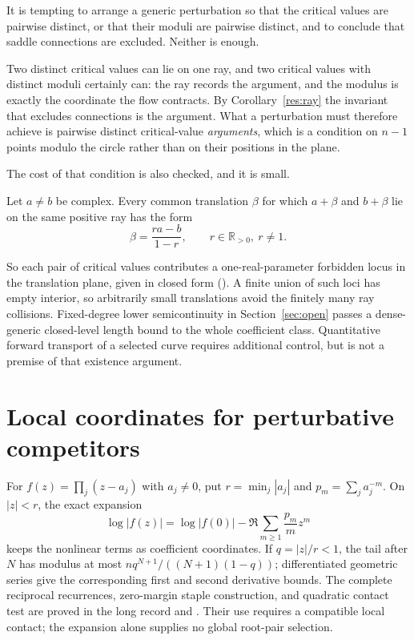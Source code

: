\documentclass[11pt]{article}
\newcommand{\pdecl}[1]{\emph{\leanlabel{#1}}}
\begin{document}
It is tempting to arrange a generic perturbation so that the critical values
are pairwise distinct, or that their moduli are pairwise distinct, and to
conclude that saddle connections are excluded.  Neither is enough.

Two distinct critical values can lie on one ray, and two critical values with
distinct moduli certainly can: the ray records the argument, and the modulus is
exactly the coordinate the flow contracts.  By Corollary~\ref{res:ray} the
invariant that excludes connections is the argument.  What a perturbation must
therefore achieve is pairwise distinct critical-value \emph{arguments}, which is
a condition on $n-1$ points modulo the circle rather than on their positions in
the plane.

The cost of that condition is also checked, and it is small.

\begin{theorem}\label{res:locus}
Let $a\ne b$ be complex.  Every common translation $\beta$ for which $a+\beta$
and $b+\beta$ lie on the same positive ray has the form
\[
  \beta=\frac{ra-b}{1-r},
  \qquad r\in\mathbb{R}_{>0},\ r\ne1 .
\]
\end{theorem}

\noindent So each pair of critical values contributes a one-real-parameter
forbidden locus in the translation plane, given in closed form
(\pdecl{translated_samePositiveRay_parameterization}).  A finite union of such
loci has empty interior, so arbitrarily small translations avoid the
finitely many ray collisions.  Fixed-degree lower semicontinuity in
Section~\ref{sec:open} passes a dense-generic closed-level length bound to the
whole coefficient class.  Quantitative forward transport of a selected curve
requires additional control, but is not a premise of that existence argument.

\section{Local coordinates for perturbative competitors}
\label{sec:reciprocal}

For $f(z)=\prod_j(z-a_j)$ with $a_j\ne0$, put $r=\min_j|a_j|$ and
$p_m=\sum_j a_j^{-m}$.  On $|z|<r$, the exact expansion
\[
 \log|f(z)|=\log|f(0)|-\Re\sum_{m\ge1}\frac{p_m}{m}z^m
\]
keeps the nonlinear terms as coefficient coordinates.  If $q=|z|/r<1$,
the tail after $N$ has modulus at most
$nq^{N+1}/((N+1)(1-q))$; differentiated geometric series give the
corresponding first and second derivative bounds.
The complete reciprocal recurrences, zero-margin staple construction, and
quadratic contact test are proved in the long record and
.
Their use requires a compatible local contact; the expansion alone supplies
no global root-pair selection.
\end{document}
